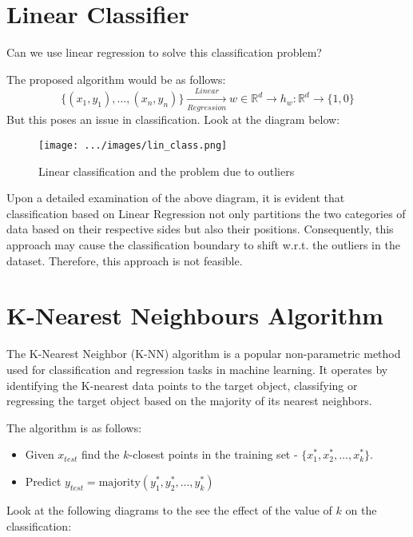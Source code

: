 \documentclass[
]{article}
\providecommand{\tightlist}{%
  \setlength{\itemsep}{0pt}\setlength{\parskip}{0pt}}
\begin{document}
\hypertarget{linear-classifier}{%
\section{Linear Classifier}\label{linear-classifier}}

Can we use linear regression to solve this classification problem?

The proposed algorithm would be as follows: \[
\{(x_1, y_1), \ldots, (x_n,y_n)\} \xrightarrow[Regression]{Linear} w \in \mathbb{R}^d\rightarrow h_w: \mathbb{R}^d \rightarrow \{1, 0\}
\] But this poses an issue in classification. Look at the diagram below:

\begin{figure}
\centering
\texttt{[image: .../images/lin\_class.png]}
\caption{Linear classification and the problem due to outliers}
\end{figure}

Upon a detailed examination of the above diagram, it is evident that
classification based on Linear Regression not only partitions the two
categories of data based on their respective sides but also their
positions. Consequently, this approach may cause the classification
boundary to shift w.r.t. the outliers in the dataset. Therefore, this
approach is not feasible.

\hypertarget{k-nearest-neighbours-algorithm}{%
\section{K-Nearest Neighbours
Algorithm}\label{k-nearest-neighbours-algorithm}}

The K-Nearest Neighbor (K-NN) algorithm is a popular non-parametric
method used for classification and regression tasks in machine learning.
It operates by identifying the K-nearest data points to the target
object, classifying or regressing the target object based on the
majority of its nearest neighbors.

The algorithm is as follows:

\begin{itemize}
\tightlist
\item
  Given \(x_{test}\) find the \(k\)-closest points in the training set -
  \(\{x_1^*, x_2^*, \ldots, x_k^*\}\).
\item
  Predict \(y_{test} = \text{majority}(y_1^*, y_2^*, \ldots, y_k^*)\)
\end{itemize}

Look at the following diagrams to the see the effect of the value of
\(k\) on the classification:
\end{document}
